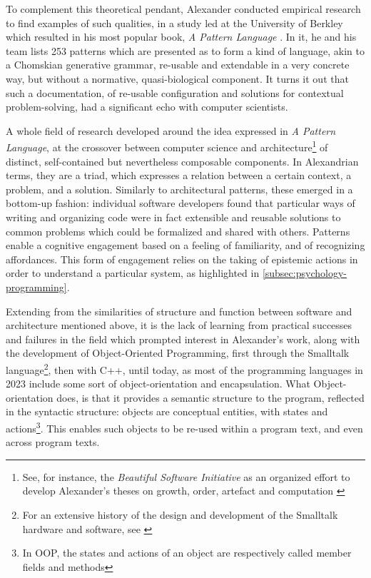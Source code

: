 To complement this theoretical pendant, Alexander conducted empirical research to find examples of such qualities, in a study led at the University of Berkley which resulted in his most popular book, \emph{A Pattern Language} \citep{alexander_pattern_1977}. In it, he and his team lists 253 patterns which are presented as to form a kind of language, akin to a Chomskian generative grammar, re-usable and extendable in a very concrete way, but without a normative, quasi-biological component. It turns it out that such a documentation, of re-usable configuration and solutions for contextual problem-solving, had a significant echo with computer scientists.

A whole field of research developed around the idea expressed in \emph{A Pattern Language}, at the crossover between computer science and architecture\footnote{See, for instance, the \emph{Beautiful Software Initiative} as an organized effort to develop Alexander's theses on growth, order, artefact and computation \citep{bryant_beautiful_2022}} of distinct, self-contained but nevertheless composable components. In Alexandrian terms, they are a triad, which expresses a relation between a certain context, a problem, and a solution. Similarly to architectural patterns, these emerged in a bottom-up fashion: individual software developers found that particular ways of writing and organizing code were in fact extensible and reusable solutions to common problems which could be formalized and shared with others. Patterns enable a cognitive engagement based on a feeling of familiarity, and of recognizing affordances. This form of engagement relies on the taking of epistemic actions in order to understand a particular system, as highlighted in \ref{subsec:psychology-programming}.

Extending from the similarities of structure and function between software and architecture mentioned above, it is the lack of learning from practical successes and failures in the field which prompted interest in Alexander's work, along with the development of Object-Oriented Programming, first through the Smalltalk language\footnote{For an extensive history of the design and development of the Smalltalk hardware and software, see \citep{kay_early_1993}}, then with C++, until today, as most of the programming languages in 2023 include some sort of object-orientation and encapsulation. What Object-orientation does, is that it provides a semantic structure to the program, reflected in the syntactic structure: objects are conceptual entities, with states and actions\footnote{In OOP, the states and actions of an object are respectively called member fields and methods}. This enables such objects to be re-used within a program text, and even across program texts.


